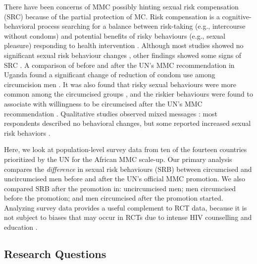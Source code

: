 \documentclass[12pt,]{article}
\begin{document}
There have been concerns of MMC possibly hinting sexual risk
compensation (SRC)
\autocites{AbboHabe13}{AndeCock12}{BrooEtze10}{CassHalp06}{EatoKali09}{EatoCain11}{GreeMaha13}{GrunHenn12}{GustKres11}{HeweHall12}{HogbLidd08}{KaliEato07}{L_EnLanh14}{MattCamp10}{PadiBuve08}{RiesAchi10}{SACE09}{WestAgot12}
because of the partial protection of MC. Risk compensation is a
cognitive-behavioral process searching for a balance between risk-taking
(e.g., intercourse without condoms) and potential benefits of risky
behaviours (e.g., sexual pleasure) responding to health intervention
\autocites{Chen13}{HogbLidd08}{KaliEato07}{KatzSchw02}{SheeChu01}{Unde13}{WilsGore04}.
Although most studies showed no significant sexual risk behaviour
changes
\autocites{AgotKiar07}{AuveTalj05}{BailMose07}{GrayKigo07}{GrayKigo12}{KongKigo12}{MattCamp08}{WestAgot14}{ConfirmCites}{MoreCites},
other findings showed some signs of SRC
\autocites{GrunHenn12}{KibiNans14}{KongSsek14}{MaugVenk12}{MaugGodl14}{RiesAchi10}{ZungSimb16}.
A comparison of before and after the UN's MMC recommendation in Uganda
found a significant change of reduction of condom use among circumcision
men \autocite{KibiSand16}. It was also found that risky sexual
behaviours were more common among the circumcised groups
\autocites{KibiNans14}{KibiSand16}, and the riskier behaviours were
found to associate with willingness to be circumcised after the UN's MMC
recommendation \autocite{KibiMaku15}. Qualitative studies observed mixed
messages \autocites{RiesAchi10}{GrunHenn12}: most respondents described
no behavioral changes, but some reported increased sexual risk behaviors
\autocites{GrunHenn12}{RiesAchi10}.

Here, we look at population-level survey data from ten of the fourteen
countries prioritized by the UN for the African MMC scale-up. Our
primary analysis compares the \emph{difference} in sexual risk
behaviours (SRB) between circumcised and uncircumcised men before and
after the UN's official MMC promotion. We also compared SRB after the
promotion in: uncircumcised men; men circumcised before the promotion;
and men circumcised after the promotion started. Analyzing survey data
provides a useful complement to RCT data, because it is not subject to
biases that may occur in RCTs due to intense HIV counselling and
education \autocite{MatoSsem07}.

\subsection{Research Questions}\label{research-questions}
\end{document}
